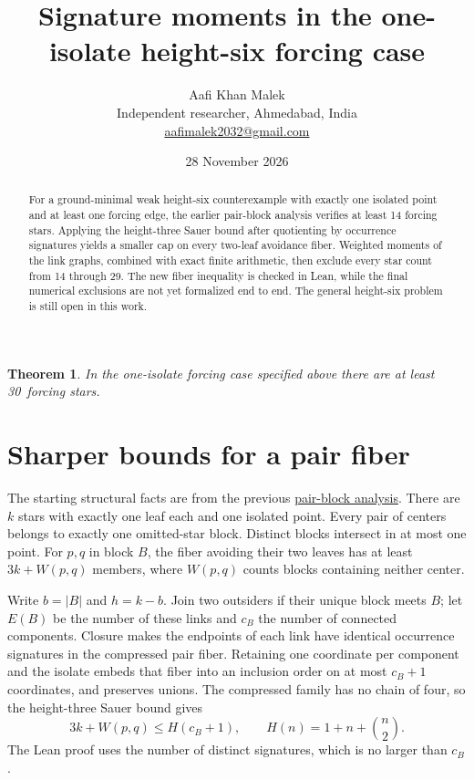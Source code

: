 \documentclass[11pt,letterpaper]{article}
\title{Signature moments in the one-isolate height-six forcing case}
\author{Aafi Khan Malek\\ \small Independent researcher, Ahmedabad, India\\
\small\href{mailto:aafimalek2032@gmail.com}{aafimalek2032@gmail.com}}
\date{28 November 2026}
\newtheorem{theorem}{Theorem}
\newcommand{\lastcase}{29}
\newcommand{\newbound}{30}
\begin{document}
\maketitle

\begin{abstract}
For a ground-minimal weak height-six counterexample with exactly one
isolated point and at least one forcing edge, the earlier pair-block
analysis verifies at least 14 forcing stars. Applying the height-three
Sauer bound after quotienting by occurrence signatures yields a smaller
cap on every two-leaf avoidance fiber. Weighted moments of the link
graphs, combined with exact finite arithmetic, then exclude every star
count from 14 through \lastcase. The new fiber inequality is checked
in Lean, while the final numerical exclusions are not yet formalized
end to end. The general height-six problem is still open in this work.
\end{abstract}

\begin{theorem}
In the one-isolate forcing case specified above there are at least
\newbound\ forcing stars.
\end{theorem}

\section{Sharper bounds for a pair fiber}

The starting structural facts are from the previous
\href{https://github.com/Aafimalek/novel-discoveries/blob/research/parallel-foundations/frankl-height-six/star-counting.md}{pair-block analysis}.
There are $k$ stars with exactly one leaf each and one isolated point.
Every pair of centers belongs to exactly one omitted-star block.
Distinct blocks intersect in at most one point. For $p,q$ in block $B$,
the fiber avoiding their two leaves has at least $3k+W(p,q)$ members,
where $W(p,q)$ counts blocks containing neither center.

Write $b=|B|$ and $h=k-b$. Join two outsiders if their unique block
meets $B$; let $E(B)$ be the number of these links and $c_B$ the number
of connected components. Closure makes the endpoints of each link
have identical occurrence signatures in the compressed pair fiber.
Retaining one coordinate per component and the isolate embeds that
fiber into an inclusion order on at most $c_B+1$ coordinates, and
preserves unions. The compressed family has no chain of four, so the
height-three Sauer bound gives
\[
3k+W(p,q)\le H(c_B+1),\qquad H(n)=1+n+\binom n2 .
\]
The Lean proof uses the number of distinct signatures, which is no
larger than $c_B$.
\end{document}

